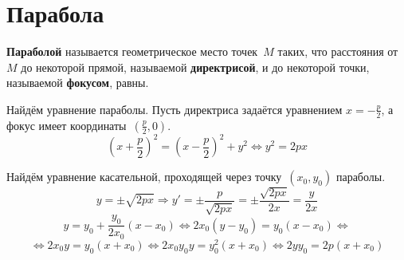 \section{Парабола}
 \textbf{Параболой} называется геометрическое место точек~$M$ таких, что расстояния от~$M$ до некоторой прямой, называемой \textbf{директрисой}, и до некоторой точки, называемой \textbf{фокусом}, равны.

Найдём уравнение параболы.
Пусть директриса задаётся уравнением $x = -\frac{p}2$, а фокус имеет координаты~$\left(\frac{p}2, 0\right)$.
\begin{equation*}
\left(x + \frac{p}2\right)^2 = \left(x - \frac{p}2\right)^2 + y^2 \Leftrightarrow
y^2 = 2px
\end{equation*}

Найдём уравнение касательной, проходящей через точку~$(x_0, y_0)$ параболы.
\begin{equation*}
y = \pm\sqrt{2px} \Rightarrow
y' = \pm\frac{p}{\sqrt{2px}} =
\pm\frac{\sqrt{2px}}{2x} =
\frac{y}{2x}
\end{equation*}
\begin{equation*}
y = y_0 + \frac{y_0}{2x_0} (x - x_0) \Leftrightarrow
2 x_0 (y - y_0) = y_0 (x - x_0) \Leftrightarrow
\end{equation*}
\begin{equation*}
\Leftrightarrow 2 x_0 y = y_0 (x + x_0) \Leftrightarrow
2 x_0 y_0 y = y_0^2 (x + x_0) \Leftrightarrow
2 y y_0 = 2p(x + x_0)
\end{equation*}